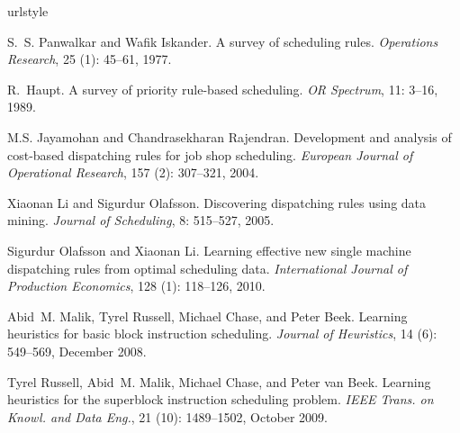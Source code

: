 \documentclass[10pt,a4paper]{article}
\begin{document}

\begin{thebibliography}{11}
    \providecommand{\natexlab}[1]{#1}
    \providecommand{\url}[1]{\texttt{#1}}
    \expandafter\ifx\csname urlstyle\endcsname\relax
    \providecommand{\doi}[1]{doi: #1}\else
    \providecommand{\doi}{doi: \begingroup \urlstyle{rm}\Url}\fi
    
    S.~S. Panwalkar and Wafik Iskander.
    \newblock A survey of scheduling rules.
    \newblock \emph{Operations Research}, 25 (1): 45--61, 
    1977.
    
    R.~Haupt.
    \newblock A survey of priority rule-based scheduling.
    \newblock \emph{OR Spectrum}, 11: 3--16, 1989.
    
    M.S. Jayamohan and Chandrasekharan Rajendran.
    \newblock Development and analysis of cost-based dispatching rules for job 
    shop
    scheduling.
    \newblock \emph{European Journal of Operational Research}, 157
    (2): 307--321, 2004.
    
    Xiaonan Li and Sigurdur Olafsson.
    \newblock Discovering dispatching rules using data mining.
    \newblock \emph{Journal of Scheduling}, 8: 515--527, 2005.
    
    Sigurdur Olafsson and Xiaonan Li.
    \newblock Learning effective new single machine dispatching rules from 
    optimal
    scheduling data.
    \newblock \emph{International Journal of Production Economics}, 128
    (1): 118--126, 2010.
    
    Abid~M. Malik, Tyrel Russell, Michael Chase, and Peter Beek.
    \newblock Learning heuristics for basic block instruction scheduling.
    \newblock \emph{Journal of Heuristics}, 14 (6): 549--569,
    December 2008.
    
    Tyrel Russell, Abid~M. Malik, Michael Chase, and Peter van Beek.
    \newblock Learning heuristics for the superblock instruction scheduling
    problem.
    \newblock \emph{IEEE Trans. on Knowl. and Data Eng.}, 21
    (10): 1489--1502, October 2009.
    

\end{thebibliography}
\end{document}

